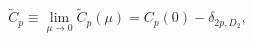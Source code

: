 \begin{equation}
    \label{tildecp}
    \tilde{C}_{p}\equiv\lim_{\mu\to0}
    \tilde{C}_p(\mu)=C_p(0)-\delta_{2 p, D_2},
\end{equation}


